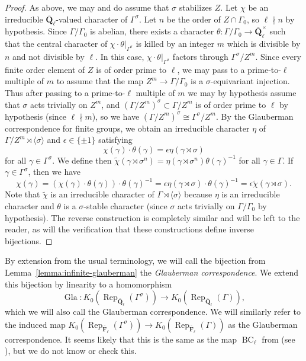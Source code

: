 \documentclass[reqno]{amsart}
\numberwithin{equation}{subsection}
\newcommand{\F}{\mathbf{F}}
\newcommand{\wt}[1]{\widetilde{#1}}
\newcommand{\Q}{\mathbf{Q}}
\newcommand{\ol}[1]{\overline{#1}}
\newcommand{\co}{\colon}
\DeclareMathOperator{\Rep}{Rep}
\DeclareMathOperator{\Gla}{Gla}
\theoremstyle{remark}
\numberwithin{equation}{subsection}
\numberwithin{figure}{subsection}
\begin{document}
\begin{proof}
    As above, we may and do assume that $\sigma$ stabilizes $Z$. Let $\chi$ be an irreducible $\ol\Q_\ell$-valued character of $\Gamma^\sigma$. Let $n$ be the order of $Z \cap \Gamma_0$, so $\ell \nmid n$ by hypothesis. Since $\Gamma/\Gamma_0$ is abelian, there exists a character $\theta\colon \Gamma/\Gamma_0 \to \ol\Q_\ell^\times$ such that the central character of $\chi\cdot\theta|_{\Gamma^\sigma}$ is killed by an integer $m$ which is divisible by $n$ and not divisible by $\ell$. In this case, $\chi \cdot \theta|_{\Gamma^\sigma}$ factors through $\Gamma^\sigma/Z^m$. Since every finite order element of $Z$ is of order prime to $\ell$, we may pass to a prime-to-$\ell$ multiple of $m$ to assume that the map $Z^m \to \Gamma/\Gamma_0$ is a $\sigma$-equivariant injection. Thus after passing to a prime-to-$\ell$ multiple of $m$ we may by hypothesis assume that $\sigma$ acts trivially on $Z^m$, and $(\Gamma/Z^m)^\sigma \subset \Gamma/Z^m$ is of order prime to $\ell$ by hypothesis (since $\ell \nmid m$), so we have $(\Gamma/Z^m)^\sigma \cong \Gamma^\sigma/Z^m$. By the Glauberman correspondence for finite groups, we obtain an irreducible character $\eta$ of $\Gamma/Z^m \rtimes \langle\sigma\rangle$ and $\epsilon \in \{\pm 1\}$ satisfying
    \[
    \chi(\gamma) \cdot \theta(\gamma) = \epsilon\eta(\gamma\rtimes\sigma)
    \]
    for all $\gamma \in \Gamma^\sigma$. We define then $\wt\chi(\gamma\rtimes\sigma^n) = \eta(\gamma\rtimes\sigma^n)\theta(\gamma)^{-1}$ for all $\gamma \in \Gamma$. If $\gamma \in \Gamma^\sigma$, then we have
    \[
    \chi(\gamma) = (\chi(\gamma) \cdot \theta(\gamma)) \cdot \theta(\gamma)^{-1} = \epsilon\eta(\gamma\rtimes\sigma) \cdot \theta(\gamma)^{-1} = \epsilon\wt\chi(\gamma \rtimes\sigma).
    \]
    Note that $\wt\chi$ is an irreducible character of $\Gamma \rtimes\langle\sigma\rangle$ because $\eta$ is an irreducible character and $\theta$ is a $\sigma$-stable character (since $\sigma$ acts trivially on $\Gamma/\Gamma_0$ by hypothesis). The reverse construction is completely similar and will be left to the reader, as will the verification that these constructions define inverse bijections.
\end{proof}

By extension from the usual terminology, we will call the bijection from Lemma~\ref{lemma:infinite-glauberman} the \textit{Glauberman correspondence}. We extend this bijection by linearity to a homomorphism
\[
\Gla\co K_0(\Rep_{\ol\Q_\ell}(\Gamma^\sigma)) \to K_0(\Rep_{\ol\Q_\ell}(\Gamma)),
\]
which we will also call the Glauberman correspondence. We will similarly refer to the induced map $K_0(\Rep_{\ol\F_\ell}(\Gamma^\sigma)) \to K_0(\Rep_{\ol\F_\ell}(\Gamma))$ as the Glauberman correspondence. It seems likely that this is the same as the map $\operatorname{BC}_\ell$ from \cite[\S 2]{Cot26a} (see \cite[Remark (1.3.2) (ii)]{Kaw87}), but we do not know or check this.
\end{document}
